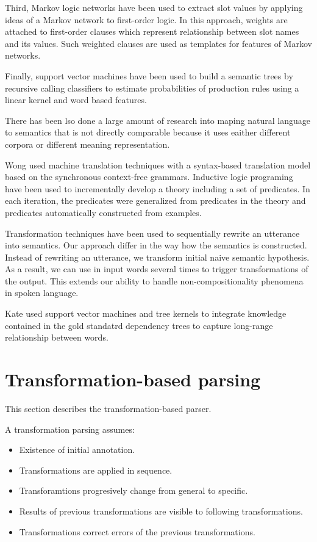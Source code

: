 \documentclass[11pt]{article}
\begin{document}
Third, Markov logic networks \cite{meza08a,meza08b} have been used to extract slot values by applying ideas of a Markov network to first-order logic. In this approach, weights are attached to first-order clauses which represent relationship between slot names and its values. Such weighted clauses are used as templates for features of Markov networks.

Finally, support vector machines \cite{mairesse09} have been used to build a semantic trees by recursive calling classifiers to estimate probabilities of production rules using a linear kernel and word based features.

There has been lso done a large amount of research into maping natural language to semantics that is not directly comparable because it uses eaither different corpora or different meaning representation. 

Wong \cite{wong06} used machine translation techniques with a syntax-based translation model based on the synchronous context-free grammars. 
Inductive logic programing \cite{tang01} have been used to incrementally develop a theory including a set of predicates. In each iteration, the predicates were generalized from predicates in the theory and predicates automatically constructed from examples. 

Transformation techniques \cite{kate05} have been used to sequentially rewrite an utterance into semantics. Our approach differ in the way how the semantics is constructed. Instead of rewriting an utterance, we transform initial naive semantic hypothesis. As a result, we can use in input words several times to trigger transformations of the output. This extends our ability to handle non-compositionality phenomena in spoken language.

Kate \cite{kate08} used support vector machines and tree kernels to integrate knowledge contained in the gold standatrd dependency trees to capture long-range relationship between words. 

\section{Transformation-based parsing}
This section describes the transformation-based parser. 

A transformation parsing assumes:
\begin{itemize}
\item Existence of initial annotation.
\item Transformations are applied in sequence. 
\item Transforamtions progresively change from general to specific.
\item Results of previous transformations are visible to following transformations.
\item Transformations correct errors of the previous transformations.
\end{itemize}
\end{document}
